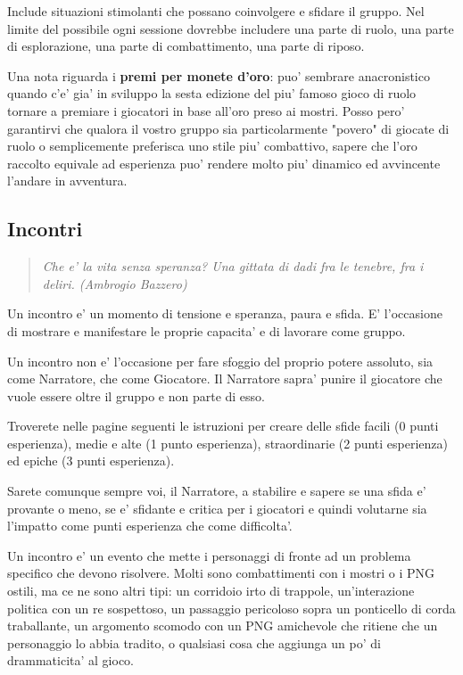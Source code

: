 \documentclass[a4paper,11pt,twoside,openany]{book}
\begin{document}
Include situazioni stimolanti che possano coinvolgere e sfidare il gruppo.
Nel limite del possibile ogni sessione dovrebbe includere una parte di ruolo, una parte di esplorazione, una parte di combattimento, una parte di riposo.

\bigskip

Una nota riguarda i \textbf{premi per monete d'oro}: puo' sembrare anacronistico quando c'e' gia' in sviluppo la sesta edizione del piu' famoso gioco di ruolo tornare a premiare i giocatori in base all'oro preso ai mostri. Posso pero' garantirvi che qualora il vostro gruppo sia particolarmente "povero" di giocate di ruolo o semplicemente preferisca uno stile piu' combattivo, sapere che l'oro raccolto equivale ad esperienza puo' rendere molto piu' dinamico ed avvincente l'andare in avventura.

\subsection{Incontri}


\begin{quote}\textit{
{Che e' la vita senza speranza? Una gittata di dadi fra le tenebre, fra i deliri. (Ambrogio Bazzero)}
}\end{quote}

\label{incontri}

Un incontro e' un momento di tensione e speranza, paura e sfida. E' l'occasione di mostrare e manifestare le proprie capacita' e di lavorare come gruppo.

Un incontro non e' l'occasione per fare sfoggio del proprio potere assoluto, sia come Narratore, che come Giocatore. Il Narratore sapra' punire il giocatore che vuole essere oltre il gruppo e non parte di esso.

Troverete nelle pagine seguenti le istruzioni per creare delle sfide facili (0 punti esperienza), medie e alte (1 punto esperienza), straordinarie (2 punti esperienza) ed epiche (3 punti esperienza).

Sarete comunque sempre voi, il Narratore, a stabilire e sapere se una sfida e' provante o meno, se e' sfidante e critica per i giocatori e quindi volutarne sia l'impatto come punti esperienza che come difficolta'.

Un incontro e' un evento che mette i personaggi di fronte ad un problema specifico che devono risolvere. Molti sono combattimenti con i mostri o i PNG ostili, ma ce ne sono altri tipi: un corridoio irto di trappole, un'interazione politica con un re sospettoso, un passaggio pericoloso sopra un ponticello di corda traballante, un argomento scomodo con un PNG amichevole che ritiene che un personaggio lo abbia tradito, o qualsiasi cosa che aggiunga un po' di drammaticita' al gioco.
\end{document}

